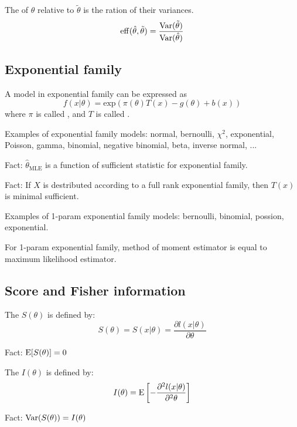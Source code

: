 The  of $\hat{\theta}$ relative to $\tilde{\theta}$ is the ration of their variances.
\[\mathrm{eff}(\hat{\theta}, \tilde{\theta}) = \frac{\mathrm{Var}(\tilde{\theta})}{\mathrm{Var}(\hat{\theta})}\]





\subsection{Exponential family}


A model in exponential family can be expressed as
\[f(x|\theta) = \mathrm{exp}(\pi(\theta)T(x)-g(\theta)+b(x))\]
where $\pi$ is called , and $T$ is called
.

Examples of exponential family models:
	normal, bernoulli, $\chi^2$, exponential, Poisson,
	gamma, binomial, negative binomial, beta, inverse normal, ...

Fact: $\hat\theta_\mathrm{MLE}$ is a function of sufficient
statistic for exponential family.

Fact: If $X$ is destributed according to a full rank exponential
family, then $T(x)$ is minimal sufficient.


Examples of 1-param exponential family models:
	bernoulli, binomial, possion, exponential.

For 1-param exponential family, method of moment estimator
is equal to maximum likelihood estimator.

\subsection{Score and Fisher information}

The  $S(\theta)$ is defined by:
\[S(\theta) = S(x|\theta) = \frac{\partial l(x|\theta)}{\partial \theta}\]

Fact: $\mathrm{E}[S(\theta)]=0$

The  $I(\theta)$ is defined by: \[I(\theta)=\mathrm{E}\left[-\frac{\partial^2 l(x|\theta)}{\partial^2 \theta}\right]\]


Fact: $\mathrm{Var}(S(\theta))=I(\theta)$

